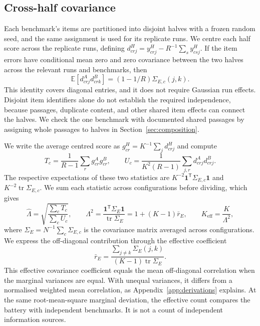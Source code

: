 \documentclass{article}
\newcommand{\Lam}{\Lambda}
\newcommand{\Sig}{\Sigma_E}
\begin{document}
\subsection{Cross-half covariance}
Each benchmark's items are partitioned into disjoint halves with a frozen random seed, and the same assignment is used for its replicate runs. We centre each half score across the replicate runs, defining $d^H_{crj}=y^H_{crj}-R^{-1}\sum_s y^H_{csj}$. If the item errors have conditional mean zero and zero covariance between the two halves across the relevant runs and benchmarks, then
\begin{equation}
\mathbb{E}[d^A_{crj}d^B_{crk}]=(1-1/R)\Sigma_{E,c}(j,k).
\label{eq:identity}
\end{equation}
This identity covers diagonal entries, and it does not require Gaussian run effects. Disjoint item identifiers alone do not establish the required independence, because passages, duplicate content, and other shared item effects can connect the halves. We check the one benchmark with documented shared passages by assigning whole passages to halves in Section~\ref{sec:composition}.

We write the average centred score as $g^H_{cr}=K^{-1}\sum_j d^H_{crj}$ and compute
\begin{equation}
T_c=\frac{1}{R-1}\sum_r g^A_{cr}g^B_{cr},\qquad
U_c=\frac{1}{K^2(R-1)}\sum_{j,r}d^A_{crj}d^B_{crj}.
\label{eq:tu}
\end{equation}
The respective expectations of these two statistics are $K^{-2}\mathbf{1}^{\mathsf T}\Sigma_{E,c}\mathbf{1}$ and $K^{-2}\operatorname{tr}\Sigma_{E,c}$. We sum each statistic across configurations before dividing, which gives
\begin{equation}
\widehat\Lam=\sqrt{\frac{\sum_c T_c}{\sum_c U_c}},\qquad
\Lam^2=\frac{\mathbf{1}^{\mathsf T}\Sig\mathbf{1}}{\operatorname{tr}\Sig}
=1+(K-1)\bar r_E,\qquad K_{\mathrm{eff}}=\frac{K}{\Lam^2},
\label{eq:lambda}
\end{equation}
where $\Sig=N^{-1}\sum_c\Sigma_{E,c}$ is the covariance matrix averaged across configurations. We express the off-diagonal contribution through the effective coefficient
\begin{equation}
\bar r_E=\frac{\sum_{j\ne k}\Sigma_E(j,k)}{(K-1)\operatorname{tr}\Sig}.
\label{eq:effective}
\end{equation}
This effective covariance coefficient equals the mean off-diagonal correlation when the marginal variances are equal. With unequal variances, it differs from a normalised weighted mean correlation, as Appendix~\ref{app:derivations} explains. At the same root-mean-square marginal deviation, the effective count compares the battery with independent benchmarks. It is not a count of independent information sources.
\end{document}

